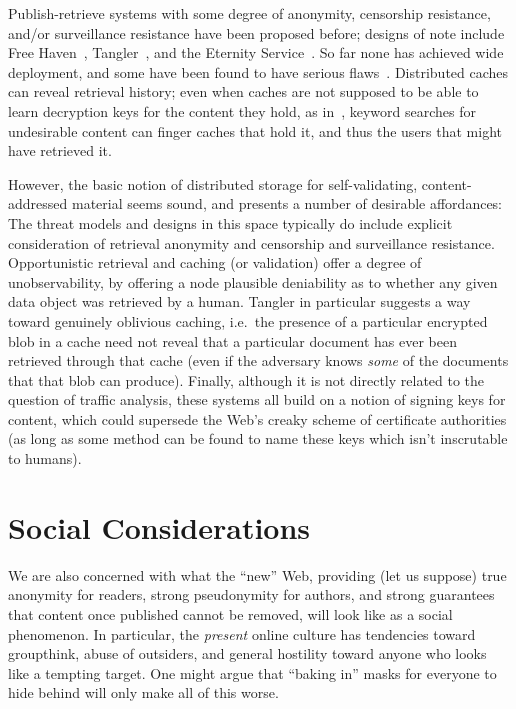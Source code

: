 \documentclass[twoside]{zarticle}
\begin{document}
Publish-retrieve systems with some degree of anonymity, censorship
resistance, and/or surveillance resistance have been proposed before;
designs of note include Free Haven~\cite{dingledine2000freehaven},
Tangler~\cite{waldman2001tangler}, and the Eternity
Service~\cite{anderson1996eternity, benes2001strongeternity}. So far
none has achieved wide deployment, and some have been found to have
serious flaws~\cite{kugler2003gnunet}.  Distributed caches can reveal
retrieval history; even when caches are not supposed to be able to
learn decryption keys for the content they hold, as
in~\textcite{serjantov2002anonymizing}, keyword searches for
undesirable content can finger caches that hold it, and thus the users
that might have retrieved it.

However, the basic notion of distributed storage for self-validating,
content-addressed material seems sound, and presents a number of
desirable affordances: The threat models and designs in this space
typically do include explicit consideration of retrieval anonymity and
censorship and surveillance resistance.  Opportunistic retrieval and
caching (or validation) offer a degree of unobservability, by offering
a node plausible deniability as to whether any given data object was
retrieved by a human.  Tangler in particular suggests a way toward
genuinely oblivious caching, i.e.\ the presence of a particular
encrypted blob in a cache need not reveal that a particular document
has ever been retrieved through that cache (even if the adversary
knows \emph{some} of the documents that that blob can produce).
Finally, although it is not directly related to the question of
traffic analysis, these systems all build on a notion of signing keys
for content, which could supersede the Web's creaky scheme of
certificate authorities (as long as some method can be found to
name these keys which isn't inscrutable to humans).

\section{Social Considerations}

We are also concerned with what the “new” Web, providing (let us
suppose) true anonymity for readers, strong pseudonymity for authors,
and strong guarantees that content once published cannot be removed,
will look like as a social phenomenon.  In particular, the
\emph{present} online culture has tendencies toward groupthink, abuse
of outsiders, and general hostility toward anyone who looks like a
tempting target. One might argue that “baking in” masks for everyone
to hide behind will only make all of this worse.
\end{document}
